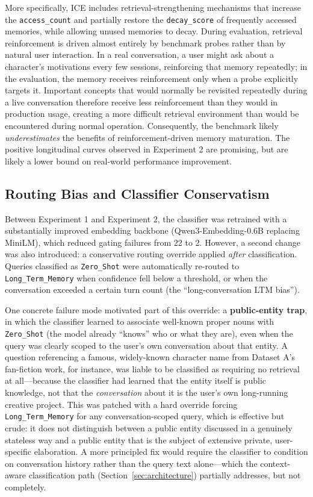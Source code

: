\documentclass[11pt,a4paper]{article}
\begin{document}
More specifically, ICE includes retrieval-strengthening mechanisms that increase the \texttt{access\_count} and partially restore the \texttt{decay\_score} of frequently accessed memories, while allowing unused memories to decay. During evaluation, retrieval reinforcement is driven almost entirely by benchmark probes rather than by natural user interaction. In a real conversation, a user might ask about a character's motivations every few sessions, reinforcing that memory repeatedly; in the evaluation, the memory receives reinforcement only when a probe explicitly targets it. Important concepts that would normally be revisited repeatedly during a live conversation therefore receive less reinforcement than they would in production usage, creating a more difficult retrieval environment than would be encountered during normal operation. Consequently, the benchmark likely \emph{underestimates} the benefits of reinforcement-driven memory maturation. The positive longitudinal curves observed in Experiment 2 are promising, but are likely a lower bound on real-world performance improvement.

\subsection{Routing Bias and Classifier Conservatism}
Between Experiment 1 and Experiment 2, the classifier was retrained with a substantially improved embedding backbone (Qwen3-Embedding-0.6B replacing MiniLM), which reduced gating failures from 22 to 2. However, a second change was also introduced: a conservative routing override applied \emph{after} classification. Queries classified as \texttt{Zero\_Shot} were automatically re-routed to \texttt{Long\_Term\_Memory} when confidence fell below a threshold, or when the conversation exceeded a certain turn count (the ``long-conversation LTM bias'').

One concrete failure mode motivated part of this override: a \textbf{public-entity trap}, in which the classifier learned to associate well-known proper nouns with \texttt{Zero\_Shot} (the model already ``knows'' who or what they are), even when the query was clearly scoped to the user's own conversation about that entity. A question referencing a famous, widely-known character name from Dataset A's fan-fiction work, for instance, was liable to be classified as requiring no retrieval at all---because the classifier had learned that the entity itself is public knowledge, not that the \emph{conversation} about it is the user's own long-running creative project. This was patched with a hard override forcing \texttt{Long\_Term\_Memory} for any conversation-scoped query, which is effective but crude: it does not distinguish between a public entity discussed in a genuinely stateless way and a public entity that is the subject of extensive private, user-specific elaboration. A more principled fix would require the classifier to condition on conversation history rather than the query text alone---which the context-aware classification path (Section~\ref{sec:architecture}) partially addresses, but not completely.
\end{document}
